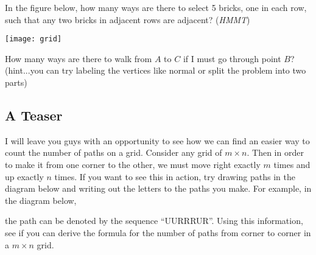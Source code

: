 \begin{problem}
In the figure below, how many ways are there to select 5 bricks, one in each row, such that any two bricks in adjacent rows are adjacent? (\textit{HMMT})
\begin{center}
\texttt{[image: grid]}
\end{center}
\end{problem}

\begin{problem}
How many ways are there to walk from $A$ to $C$ if I must go through point $B$? (hint...you can try labeling the vertices like normal or split the problem into two parts)
\begin{center}
\end{center}
\end{problem}

\subsection{A Teaser}
I will leave you guys with an opportunity to see how we can find an easier way to count the number of paths on a grid. Consider any grid of $m\times n$. Then in order to make it from one corner to the other, we must move right exactly $m$ times and up exactly $n$ times. If you want to see this in action, try drawing paths in the diagram below and writing out the letters to the paths you make. For example, in the diagram below, 

\begin{center}
\end{center}

the path can be denoted by the sequence ``UURRRUR''. Using this information, see if you can derive the formula for the number of paths from corner to corner in a $m\times n$ grid.